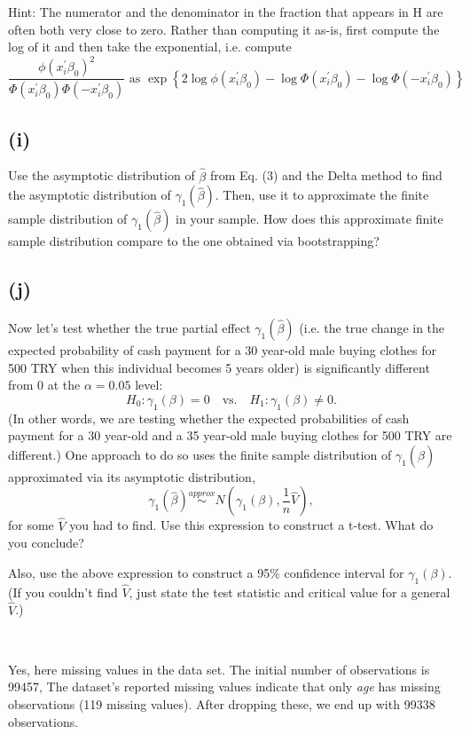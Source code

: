 \documentclass[a4paper,12pt]{article} %
\theoremstyle{nonitalic}
\newenvironment{solution}[1]
  {\renewcommand\theinnercustomsol{#1}\innercustomsol}
  {\endinnercustomsol}
\newcounter{solutionctr}[section]
\renewcommand{\thesolutionctr}{(\alph{solutionctr})}
\newenvironment{autosolution}
  {\stepcounter{solutionctr}\begin{solution}{\thesolutionctr}}
  {\end{solution}}
\begin{document}
Hint: The numerator and the denominator in the fraction that appears in H are often both
very close to zero. Rather than computing it as-is, first compute the log of it and then take
the exponential, i.e. compute 
\[
\frac{\phi(x_i^{\prime} \beta_0)^2}{\Phi(x_i^{\prime} \beta_0)\Phi(-x_i^{\prime} \beta_0)} \text{ as } \exp\left\{ 2\log \phi(x_{i}^{\prime} \beta_0) - \log \Phi(x_i^{\prime} \beta_0) - \log \Phi(-x_i^{\prime} \beta_0) \right\}
\]

\subsection*{(i)}
Use the asymptotic distribution of $\hat{\beta}$ from Eq. (3) and the Delta method to find the asymptotic distribution of $\gamma_1(\hat{\beta})$. Then, use it to approximate the finite sample distribution of $\gamma_1(\hat{\beta})$ in your sample. How does this approximate finite sample distribution compare to the one obtained via bootstrapping?

\subsection*{(j)}
Now let's test whether the true partial effect $\gamma_1(\hat{\beta})$ (i.e. the true change in the expected probability of cash payment for a 30 year-old male buying clothes for 500 TRY when this individual becomes 5 years older) is significantly different from 0 at the $\alpha = 0.05$ level:
\[
H_0 : \gamma_1(\beta) = 0 \quad \text{vs.} \quad H_1 : \gamma_1(\beta) \neq 0 .
\]
(In other words, we are testing whether the expected probabilities of cash payment for a 30 year-old and a 35 year-old male buying clothes for 500 TRY are different.) One approach to do so uses the finite sample distribution of $\gamma_1(\hat{\beta})$ approximated via its asymptotic distribution,
\[
\gamma_1(\hat{\beta}) \overset{approx}{\sim} N\left( \gamma_1(\beta), \frac{1}{n} \hat{V} \right),
\]
for some $\hat{V}$ you had to find. Use this expression to construct a t-test. What do you conclude?

Also, use the above expression to construct a 95\% confidence interval for $\gamma_1(\beta)$. (If you couldn't find $\hat{V}$, just state the test statistic and critical value for a general $\hat{V}$.)

\begin{autosolution}
    \ 

    Yes, here missing values in the data set.
    The initial number of observations is 99457,
    The dataset's reported missing values indicate that only 
    \textit{age} has missing observations (119 missing values). 
    After dropping these, we end up with 99338 observations.
\end{autosolution}
\end{document}
